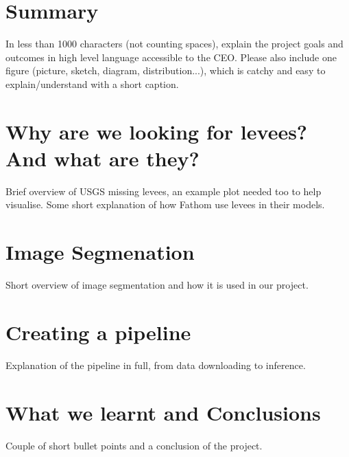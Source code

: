 \documentclass[NOTE, disdraft=true, UKenglish]{\DISCDTLATEXPATH UCLCDTDISdoc}
\begin{document}
\maketitle

\tableofcontents

\clearpage


\newpage
\section{Summary}
\label{sec:summary}
In less than 1000 characters (not counting spaces), explain the project goals and outcomes in high level  language accessible to the CEO. Please also include one figure (picture, sketch, diagram, distribution...), which is catchy and easy to explain/understand with a short caption.

\newpage
\section{Why are we looking for levees? And what are they?}
\label{sec:introduction}
%
Brief overview of USGS missing levees, an example plot needed too to help visualise. Some short explanation of how Fathom use levees in their models.
\section{Image Segmenation}
\label{sec:method}
%
Short overview of image segmentation and how it is used in our project.
\section{Creating a pipeline}
\label{sec:results}
%
Explanation of the pipeline in full, from data downloading to inference.
\section{What we learnt and Conclusions}
\label{sec:conclusion}
%
Couple of short bullet points and a conclusion of the project.
\end{document}

